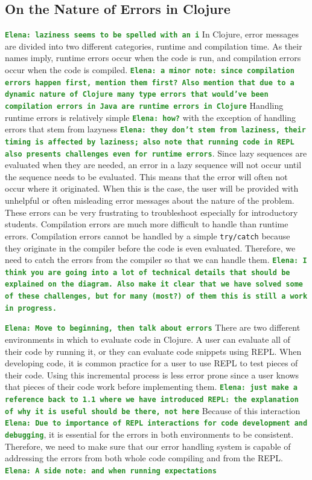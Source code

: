 \documentclass[12pt]{article}
\newcommand{\comment}[1]{{\bf \tt  {#1}}}
\newcommand{\emcomment}[1]{\textcolor{ForestGreen}{\comment{Elena: {#1}}}}
\begin{document}
\subsection{On the Nature of Errors in Clojure}

\emcomment{laziness seems to be spelled with an i}
In Clojure, error messages are divided into two different categories, runtime and compilation time. As their names imply, runtime errors occur when the code is run, and compilation errors occur when the code is compiled. 
\emcomment{a minor note: since compilation errors happen first, mention them first? Also mention that due to a dynamic nature of Clojure many type errors that would've been compilation errors in Java are runtime errors in Clojure} 
Handling runtime errors is relatively simple \emcomment{how?} with the exception of handling errors that stem from lazyness \emcomment{they don't stem from laziness, their timing is affected by laziness; also note that running code in REPL also presents challenges even for runtime errors}. Since lazy sequences are evaluated when they are needed, an error in a lazy sequence will not occur until the sequence needs to be evaluated. This means that the error will often not occur where it originated. When this is the case, the user will be provided with unhelpful or often misleading error messages about the nature of the problem. These errors can be very frustrating to troubleshoot especially for introductory students. Compilation errors are much more difficult to handle than runtime errors. Compilation errors cannot be handled by a simple {\tt try/catch} because they originate in the compiler before the code is even evaluated. Therefore, we need to catch the errors from the compiler so that we can handle them.
\emcomment{I think you are going into a lot of technical details that should be explained on the diagram. Also make it clear that we have solved some of these challenges, but for many (most?) of them this is still a work in progress.}

\emcomment{Move to beginning, then talk about errors}
There are two different environments in which to evaluate code in Clojure. A user can evaluate all of their code by running it, or they can evaluate code snippets using REPL. When developing code, it is common practice for a user to use REPL to test pieces of their code. Using this incremental process is less error prone since a user knows that pieces of their code work before implementing them. \emcomment{just make a reference back to 1.1 where we have introduced REPL: the explanation of why it is useful should be there, not here} Because of this interaction \emcomment{Due to importance of REPL interactions for code development and debugging}, it is essential for the errors in both environments to be consistent. Therefore, we need to make sure that our error handling system is capable of addressing the errors from both whole code compiling and from the REPL.
\emcomment{A side note: and when running expectations}
 
\end{document}
